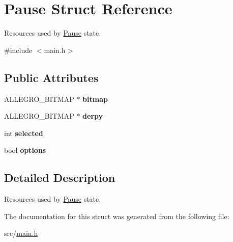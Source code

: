 \hypertarget{structPause}{\section{\-Pause \-Struct \-Reference}
\label{structPause}
}


\-Resources used by \hyperlink{structPause}{\-Pause} state.  




{\ttfamily \#include $<$main.\-h$>$}

\subsection*{\-Public \-Attributes}
\begin{DoxyCompactItemize}
\item 
\hypertarget{structPause_a50c6c3e5d72008c50ae7e3aba1c794d1}{\-A\-L\-L\-E\-G\-R\-O\-\_\-\-B\-I\-T\-M\-A\-P $\ast$ {\bfseries bitmap}}\label{structPause_a50c6c3e5d72008c50ae7e3aba1c794d1}

\item 
\hypertarget{structPause_aa2a1cde9971149a5c48f10899ca97079}{\-A\-L\-L\-E\-G\-R\-O\-\_\-\-B\-I\-T\-M\-A\-P $\ast$ {\bfseries derpy}}\label{structPause_aa2a1cde9971149a5c48f10899ca97079}

\item 
\hypertarget{structPause_ae40bde724a3b29654fa27bc1aaa2a5f0}{int {\bfseries selected}}\label{structPause_ae40bde724a3b29654fa27bc1aaa2a5f0}

\item 
\hypertarget{structPause_a0b6d291938212a92004c5b19f76ea942}{bool {\bfseries options}}\label{structPause_a0b6d291938212a92004c5b19f76ea942}

\end{DoxyCompactItemize}


\subsection{\-Detailed \-Description}
\-Resources used by \hyperlink{structPause}{\-Pause} state. 

\-The documentation for this struct was generated from the following file\-:\begin{DoxyCompactItemize}
\item 
src/\hyperlink{main_8h}{main.\-h}\end{DoxyCompactItemize}
